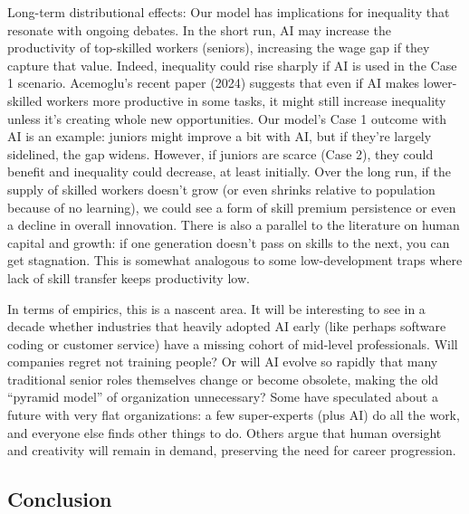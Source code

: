 \documentclass[12pt]{article}
\begin{document}
{Long-term distributional effects:} Our model has implications
for inequality that resonate with ongoing debates. In the short run,
AI may increase the productivity of top-skilled workers (seniors),
increasing the wage gap if they capture that value. Indeed,
{inequality could rise sharply} if AI is used in the Case 1
scenario. Acemoglu's recent paper (2024) suggests that even if AI
makes lower-skilled workers more productive in some tasks, it might
{still} increase inequality unless it's creating whole new
opportunities. Our model's Case 1 outcome with AI is an example:
juniors might improve a bit with AI, but if they're largely sidelined,
the gap widens. However, if juniors are scarce (Case 2), they could
benefit and inequality could decrease, at least initially. Over the
long run, if the supply of skilled workers doesn't grow (or even
shrinks relative to population because of no learning), we could see a
form of {skill premium persistence} or even a decline in
overall innovation. There is also a parallel to the literature on
{human capital and growth}: if one generation doesn't pass on
skills to the next, you can get stagnation. This is somewhat analogous
to some low-development traps where lack of skill transfer keeps
productivity low.

In terms of {empirics}, this is a nascent area. It will be
interesting to see in a decade whether industries that heavily adopted
AI early (like perhaps software coding or customer service) have a
missing cohort of mid-level professionals. Will companies regret not
training people? Or will AI evolve so rapidly that many traditional
senior roles themselves change or become obsolete, making the old
``pyramid model'' of organization unnecessary? Some have speculated
about a future with {very flat organizations}: a few
super-experts (plus AI) do all the work, and everyone else finds other
things to do. Others argue that human oversight and creativity will
remain in demand, preserving the need for career progression.

\subsection{Conclusion}\label{conclusion}
\end{document}
